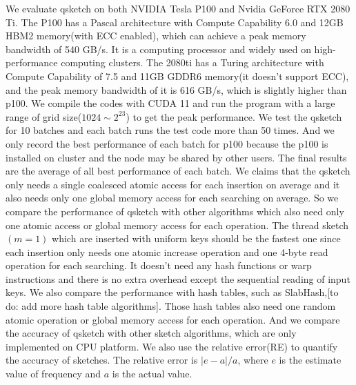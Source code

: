 \documentclass[conference]{IEEEtran}
\begin{document}



We evaluate qsketch on both NVIDIA Tesla P100 and Nvidia GeForce RTX 2080 Ti. 
The P100 has a Pascal architecture with Compute Capability 6.0 and 12GB HBM2 memory(with ECC enabled), which can achieve a peak memory bandwidth of 540 GB/s. It is a computing processor and widely used on high-performance computing clusters. The 2080ti has a Turing architecture with Compute Capability of 7.5 and 11GB GDDR6 memory(it doesn't support ECC), and the peak memory bandwidth of it is 616 GB/s, which is slightly higher than p100. We compile the codes with CUDA 11 and run the program with a large range of grid size($1024 \sim 2 ^ {23}$) to get the peak performance. We test the qsketch for 10 batches and each batch runs the test code more than 50 times. And we only record the best performance of each batch for p100 because the p100 is installed on cluster and the node may be shared by other users. The final results are the average of all best performance of each batch. We claims that the qsketch only needs a single coalesced atomic access for each insertion on average and it also needs only one global memory access for each searching on average. So we compare the performance of qsketch with other algorithms which also need only one atomic access or global memory access for each operation. The thread sketch$(m = 1)$ which are inserted with uniform keys should be the fastest one since each insertion only needs one atomic increase operation and one 4-byte read operation for each searching. It doesn't need any hash functions or warp instructions and there is no extra overhead except the sequential reading of input keys. We also compare the performance with hash tables, such as SlabHash,[to do: add more hash table algorithms]. Those hash tables also need one random atomic operation or global memory access for each operation. And we compare the accuracy of qsketch with other sketch algorithms, which are only implemented on CPU platform. We also use the relative error(RE) to quantify the accuracy of sketches\cite{b3}. The relative error is $\lvert e - a \rvert / a$, where $e$ is the estimate value of frequency and $a$ is the actual value.
\end{document}
